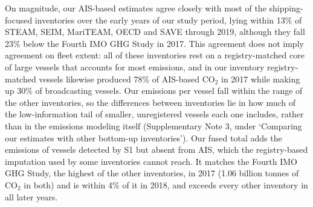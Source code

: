\documentclass[11pt]{article}
\begin{document}
On magnitude, our AIS-based estimates agree closely with most of the shipping-focused inventories over the early years of our study period, lying within 13\% of STEAM, SEIM, MariTEAM, OECD and SAVE through 2019, although they fall 23\% below the Fourth IMO GHG Study in 2017. This agreement does not imply agreement on fleet extent: all of these inventories rest on a registry-matched core of large vessels that accounts for most emissions, and in our inventory registry-matched vessels likewise produced 78\% of AIS-based CO$_{2}$ in 2017 while making up 30\% of broadcasting vessels. Our emissions per vessel fall within the range of the other inventories, so the differences between inventories lie in how much of the low-information tail of smaller, unregistered vessels each one includes, rather than in the emissions modeling itself (Supplementary Note 3, under `Comparing our estimates with other bottom-up inventories'). Our fused total adds the emissions of vessels detected by S1 but absent from AIS, which the registry-based imputation used by some inventories cannot reach. It matches the Fourth IMO GHG Study, the highest of the other inventories, in 2017 (1.06 billion tonnes of CO$_{2}$ in both) and is within 4\% of it in 2018, and exceeds every other inventory in all later years.
\end{document}
